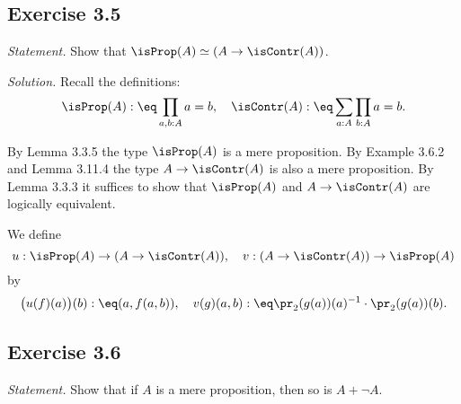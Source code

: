 \documentclass[12pt]{article}
\begin{document}




\subsection{Exercise 3.5}

\emph{Statement.} Show that $\isProp(A)\simeq(A\to\isContr(A))$. 

\nn\emph{Solution.} Recall the definitions: 
$$
\isProp(A):\eq\prod_{a,b:A}a=b,\quad\isContr(A):\eq\sum_{a:A}\prod_{b:A}a=b.
$$

By Lemma 3.3.5 the type $\isProp(A)$ is a mere proposition. By Example 3.6.2 and Lemma 3.11.4 the type $A\to\isContr(A)$ is also a mere proposition. By Lemma 3.3.3 it suffices to show that $\isProp(A)$ and $A\to\isContr(A)$ are logically equivalent. 

We define 
$$
u:\isProp(A)\to(A\to\isContr(A)),\quad v:(A\to\isContr(A))\to\isProp(A)
$$ 
by 
$$
\big(u(f)(a)\big)(b):\eq(a,f(a,b)),\quad v(g)(a,b):\eq\pr_2(g(a))(a)^{-1}\cdot\pr_2(g(a))(b).
$$%






\subsection{Exercise 3.6}\label{e36}

\emph{Statement.} Show that if $A$ is a mere proposition, then so is $A+\neg A$.
\end{document}
